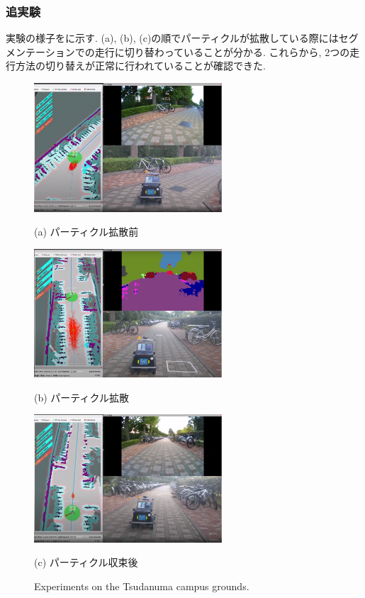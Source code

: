 \documentclass[uplatex, twocolumn, 9pt]{jsproceedings}
\begin{document}
\subsubsection{追実験}
実験の様子をに示す. (a), (b), (c)の順でパーティクルが拡散している際にはセグメンテーションでの走行に切り替わっていることが分かる. これらから, 2つの走行方法の切り替えが正常に行われていることが確認できた. 

\begin{figure}[h]
  \centering
  \begin{minipage}[b]{1\linewidth}
    \centering
    \includegraphics[width=70mm]{fig/switch-mode1.pdf}
    \caption*{(a) パーティクル拡散前}
  \end{minipage} 
  \hspace{0.03\columnwidth}
  \begin{minipage}[b]{1\linewidth}
    \centering
    \includegraphics[width=70mm]{fig/switch-mode2.pdf}
    \caption*{(b) パーティクル拡散}
  \end{minipage}
  \begin{minipage}[b]{1\linewidth}
    \centering
    \includegraphics[width=70mm]{fig/switch-mode3.pdf}
    \caption*{(c) パーティクル収束後}
  \end{minipage}
  \caption{Experiments on the Tsudanuma campus grounds.}
  \label{fig:switch-mode}%
\end{figure}
\end{document}
